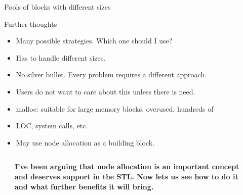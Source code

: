 \documentclass[10pt,aspectratio=169]{beamer}
\def\mbo{\node[style=mbo]}
\def\lbo{\node[style=lbo]}
\def\marrow{\draw[style=marrow]}
\begin{document}
\begin{frame}[t]{Pools of blocks with different sizes}
\end{frame}


\begin{frame}[fragile]{Further thoughts}
\begin{itemize}
\item Many possible strategies. Which one should I use?
\item Has to handle different sizes.
\item No silver bullet. Every problem requires a different approach.
\item Users do not want to care about this unless there is need.
\item malloc: suitable for large memory blocks, overused, hundreds of
\item LOC, system calls, etc.
\item May use node allocation as a building block.
\end{itemize}

\end{frame}

\begin{frame}[fragile]
{}

\begin{columns}
\begin{column}{0.15\textwidth}
\end{column}
\begin{column}{0.70\textwidth}
\begin{center}
 \Large \bf 
  I've been arguing that node allocation is an important concept and deserves
  support in the STL. Now lets us see how to do it and what further benefits
  it will bring.
\end{center}
\end{column}
\begin{column}{0.15\textwidth}
\end{column}
\end{columns}
\end{frame}
\end{document}
